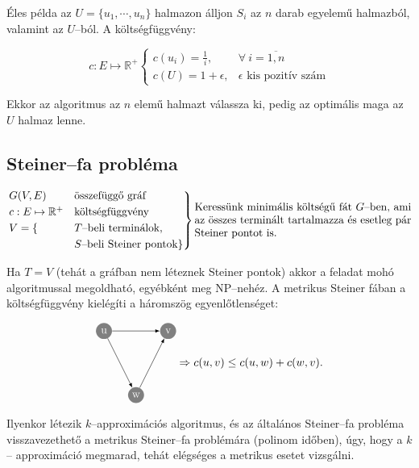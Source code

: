 Éles példa az $U=\{ u_1, \cdots, u_n \}$ halmazon álljon $S_i$ az $n$ darab
egyelemű halmazból, valamint az $U$--ból. A költségfüggvény:

\[ c:E \mapsto \mathbb{R}^+ \begin{cases} c({u_i})=\frac{1}{i}, & \forall~
i=\overline{1,n}\\
c(U)=1 + \epsilon, & \epsilon \mbox{ kis pozitív szám} \end{cases}\]

Ekkor az algoritmus az $n$ elemű halmazt válassza ki, pedig az optimális maga
az $U$ halmaz lenne.

\subsection{Steiner--fa probléma}

\[
\begin{rcases}
G(V,E) &\mbox{összefüggő gráf} \\
c:E \mapsto \mathbb{R}^+ &\mbox{költségfüggvény} \\
V = \{ &T\mbox{--beli terminálok}, \\
	   &S\mbox{--beli Steiner pontok}\}
\end{rcases}
\parbox[L]{7cm}{ Keressünk minimális költségű fát $G$--ben, ami az összes
terminált tartalmazza és esetleg pár Steiner pontot is.} \]

Ha $T=V$ (tehát a gráfban nem léteznek Steiner pontok) akkor a feladat mohó
algoritmussal megoldható, egyébként meg NP--nehéz. A metrikus Steiner fában
a költségfüggvény kielégíti a háromszög egyenlőtlenséget:


\[ \parbox[l]{2.5cm}{
\begin{tikzpicture}[scale=1]
  \tikzset{ p/.style={circle,white,fill=gray,inner sep=0pt,minimum size=0.5cm},
  }
  \node[p] (1) at (0, -3) {w};
  \node[p] (2) at (-1, -1) {u}; 
  \node[p] (3) at (+1 , -1) {v};
  
  \draw[-latex] (2) -- (1) node [midway, above] {}; 
  \draw[-latex] (2) -- (3) node [midway, below] {}; 
  \draw[-latex] (1) -- (3) node [midway, above] {};
\end{tikzpicture}} \Rightarrow
  c(u,v) \leq c(u,w)+c(w,v). 
\]

Ilyenkor létezik $k$--approximációs algoritmus, és az általános Steiner--fa
probléma visszavezethető a metrikus Steiner--fa problémára (polinom időben),
úgy, hogy a $k$-- approximáció megmarad, tehát elégséges a metrikus esetet
vizsgálni.

